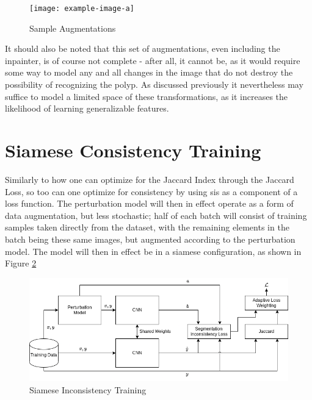 \begin{figure}
    \centering
    \texttt{[image: example-image-a]}
    \caption{Sample Augmentations}
    \label{fig:my_label}
\end{figure}

It should also be noted that this set of augmentations, even including the inpainter, is of course not complete - after all, it cannot be, as it would require some way to model any and all changes in the image that do not destroy the possibility of recognizing the polyp. As discussed previously it nevertheless may suffice to model a limited space of these transformations, as it increases the likelihood of learning generalizable features. 


\section{Siamese Consistency Training}

    Similarly to how one can optimize for the Jaccard Index through the Jaccard Loss, so too can one optimize for consistency by using \gls{sis} as a component of a loss function. The perturbation model will then in effect operate as a form of data augmentation, but less stochastic; half of each batch will consist of training samples taken directly from the dataset, with the remaining elements in the batch being these same images, but augmented according to the perturbation model. The model will then in effect be in a siamese configuration, as shown in Figure \ref{fig:consistency_training}
    
    \begin{figure}[ht]
            \centering
            \includegraphics[width=\linewidth]{illustrations/consistency_training.png}
            \caption{Siamese Inconsistency Training}
            \label{fig:consistency_training}
    \end{figure}
    
